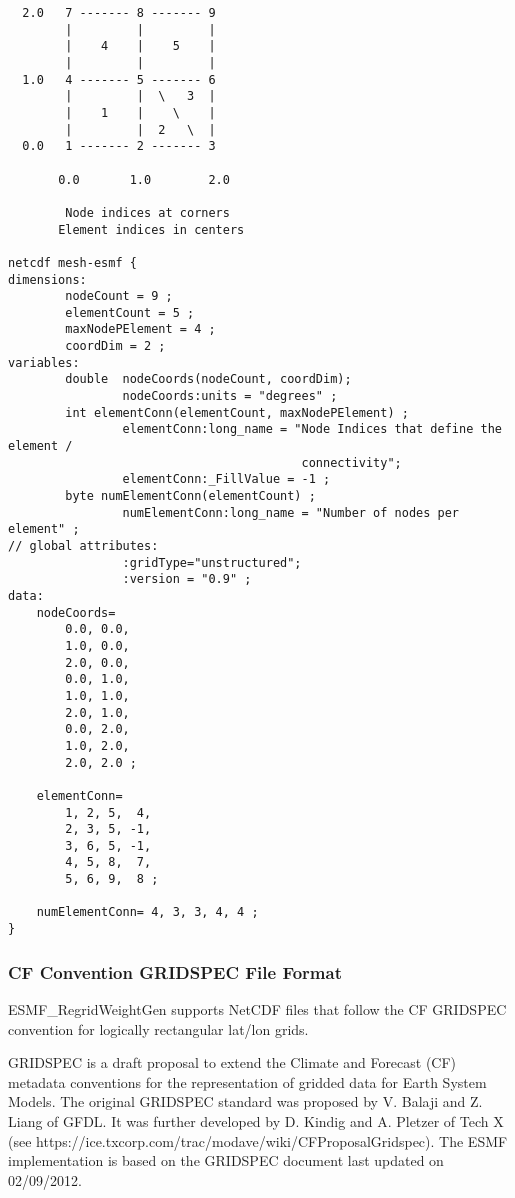 \begin{verbatim}
  2.0   7 ------- 8 ------- 9
        |         |         |
        |    4    |    5    |
        |         |         |
  1.0   4 ------- 5 ------- 6
        |         |  \   3  |
        |    1    |    \    |
        |         |  2   \  |
  0.0   1 ------- 2 ------- 3

       0.0       1.0        2.0

        Node indices at corners
       Element indices in centers

netcdf mesh-esmf {
dimensions:
        nodeCount = 9 ;
        elementCount = 5 ;
        maxNodePElement = 4 ;
        coordDim = 2 ;
variables:
        double  nodeCoords(nodeCount, coordDim);
                nodeCoords:units = "degrees" ;
        int elementConn(elementCount, maxNodePElement) ;
                elementConn:long_name = "Node Indices that define the element /
                                         connectivity";
                elementConn:_FillValue = -1 ;
        byte numElementConn(elementCount) ;
                numElementConn:long_name = "Number of nodes per element" ;
// global attributes:
                :gridType="unstructured";
                :version = "0.9" ;
data:
    nodeCoords=
        0.0, 0.0,
        1.0, 0.0,
        2.0, 0.0,
        0.0, 1.0,
        1.0, 1.0,
        2.0, 1.0,
        0.0, 2.0,
        1.0, 2.0,
        2.0, 2.0 ;

    elementConn=
        1, 2, 5,  4,
        2, 3, 5, -1,
        3, 6, 5, -1,
        4, 5, 8,  7,
        5, 6, 9,  8 ;

    numElementConn= 4, 3, 3, 4, 4 ;
}

\end{verbatim}

\subsubsection{CF Convention GRIDSPEC File Format}\label{sec:fileformat:gridspec}

ESMF\_RegridWeightGen supports NetCDF files that follow the CF GRIDSPEC convention for logically rectangular lat/lon grids.

GRIDSPEC is a draft proposal to extend the Climate and Forecast (CF) metadata conventions for the representation of gridded data for Earth System Models.  The original GRIDSPEC standard was proposed by V. Balaji and Z. Liang of GFDL.  It was further developed by D. Kindig and A. Pletzer of Tech X (see  {https://ice.txcorp.com/trac/modave/wiki/CFProposalGridspec}).  The ESMF implementation is based on the GRIDSPEC document last updated on 02/09/2012.

